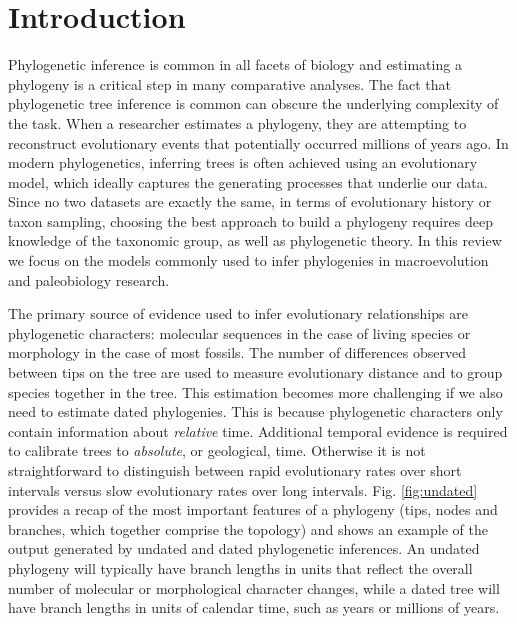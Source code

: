 
\section{Introduction}

Phylogenetic inference is common in all facets of biology and estimating a phylogeny is a critical step in many comparative analyses. The fact that phylogenetic tree inference is common can obscure the underlying complexity of the task.
When a researcher estimates a phylogeny, they are attempting to reconstruct evolutionary events that potentially occurred millions of years ago.
In modern phylogenetics, inferring trees is often achieved using an evolutionary model, which ideally captures the generating processes that underlie our data.
Since no two datasets are exactly the same, in terms of evolutionary history or taxon sampling, 
choosing the best approach to build a phylogeny requires deep knowledge of the taxonomic group, as well as phylogenetic theory.
In this review we focus on the models commonly used to infer phylogenies in macroevolution and paleobiology research.

The primary source of evidence used to infer evolutionary relationships are phylogenetic characters: molecular sequences in the case of living species or morphology in the case of most fossils. 
The number of differences observed between tips on the tree are used to measure evolutionary distance and to group species together in the tree.
This estimation becomes more challenging if we also need to estimate dated phylogenies.
This is because phylogenetic characters only contain information about \textit{relative} time. 
Additional temporal evidence is required to calibrate trees to \textit{absolute}, or geological, time.
Otherwise it is not straightforward to distinguish between rapid evolutionary rates over short intervals versus slow evolutionary rates over long intervals.
Fig. \ref{fig:undated} provides a recap of the most important features of a phylogeny (tips, nodes and branches, which together comprise the topology) and shows an example of the output generated by undated and dated phylogenetic inferences. 
An undated phylogeny will typically have branch lengths in units that reflect the overall number of molecular or morphological character changes, while a dated tree will have branch lengths in units of calendar time, such as years or millions of years.


